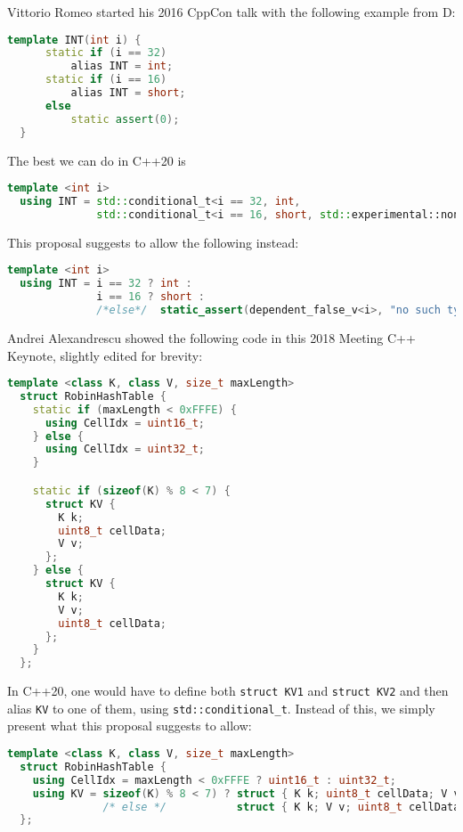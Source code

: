 \documentclass[11pt]{article}
\begin{document}
Vittorio Romeo started his 2016 CppCon talk\cite{VR16} with the following example from D:

\begin{lstlisting}[language=C++]
  template INT(int i) {
      static if (i == 32)
          alias INT = int;
      static if (i == 16)
          alias INT = short;
      else
          static assert(0);
  }
\end{lstlisting}

The best we can do in C++20 is

\begin{lstlisting}[language=C++]
  template <int i>
  using INT = std::conditional_t<i == 32, int,
              std::conditional_t<i == 16, short, std::experimental::nonesuch>;
\end{lstlisting}

This proposal suggests to allow the following instead:

\begin{lstlisting}[language=C++]
  template <int i>
  using INT = i == 32 ? int :
              i == 16 ? short :
              /*else*/  static_assert(dependent_false_v<i>, "no such type") ;
\end{lstlisting}

Andrei Alexandrescu showed the following code in this 2018 Meeting C++
Keynote\cite{AA18}, slightly edited for brevity:

\begin{lstlisting}[language=c++]
  template <class K, class V, size_t maxLength>
  struct RobinHashTable {
    static if (maxLength < 0xFFFE) {
      using CellIdx = uint16_t;
    } else {
      using CellIdx = uint32_t;
    }

    static if (sizeof(K) % 8 < 7) {
      struct KV {
        K k;
        uint8_t cellData;
        V v;
      };
    } else {
      struct KV {
        K k;
        V v;
        uint8_t cellData;
      };
    }
  };
\end{lstlisting}

In C++20, one would have to define both \texttt{struct KV1} and
\texttt{struct KV2} and then alias \texttt{KV} to one of them, using
\texttt{std::conditional\_t}. Instead of this, we simply present what
this proposal suggests to allow:

\begin{lstlisting}[language=c++]
  template <class K, class V, size_t maxLength>
  struct RobinHashTable {
    using CellIdx = maxLength < 0xFFFE ? uint16_t : uint32_t;
    using KV = sizeof(K) % 8 < 7) ? struct { K k; uint8_t cellData; V v; } :
               /* else */           struct { K k; V v; uint8_t cellData; } ;
  };
\end{lstlisting}
\end{document}
